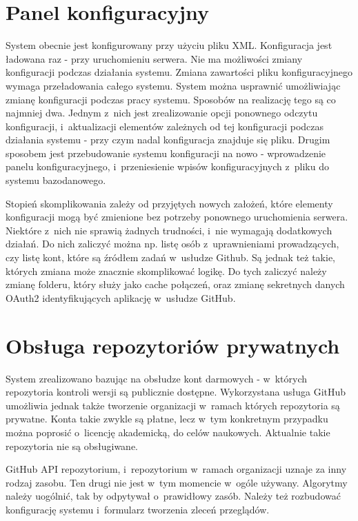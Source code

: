 \section{Panel konfiguracyjny}
System obecnie jest konfigurowany przy użyciu pliku XML. Konfiguracja jest ładowana raz - przy uruchomieniu serwera. Nie ma możliwości zmiany konfiguracji podczas działania systemu. Zmiana zawartości pliku konfiguracyjnego wymaga przeładowania całego systemu. System można usprawnić umożliwiając zmianę konfiguracji podczas pracy systemu. Sposobów na realizację tego są co najmniej dwa. Jednym z~nich jest zrealizowanie opcji ponownego odczytu konfiguracji, i~aktualizacji elementów zależnych od tej konfiguracji podczas działania systemu - przy czym nadal konfiguracja znajduje się pliku. Drugim sposobem jest przebudowanie systemu konfiguracji na nowo - wprowadzenie panelu konfiguracyjnego, i~przeniesienie wpisów konfiguracyjnych z~pliku do systemu bazodanowego.

\medskip
Stopień skomplikowania zależy od przyjętych nowych założeń, które elementy konfiguracji mogą być zmienione bez potrzeby ponownego uruchomienia serwera. Niektóre z~nich nie sprawią żadnych trudności, i~nie wymagają dodatkowych działań. Do nich zaliczyć można np. listę osób z~uprawnieniami prowadzących, czy listę kont, które są źródłem zadań w~usłudze Github. Są jednak też takie, których zmiana może znacznie skomplikować logikę. Do tych zaliczyć należy zmianę folderu, który służy jako cache połączeń, oraz zmianę sekretnych danych OAuth2 identyfikujących aplikację w~usłudze GitHub. 

\section{Obsługa repozytoriów prywatnych}
System zrealizowano bazując na obsłudze kont darmowych - w~których repozytoria kontroli wersji są publicznie dostępne. Wykorzystana usługa GitHub umożliwia jednak także tworzenie organizacji w~ramach których repozytoria są prywatne. Konta takie zwykle są płatne, lecz w~tym konkretnym przypadku można poprosić o~licencję akademicką, do celów naukowych. Aktualnie takie repozytoria nie są obsługiwane.

\medskip
GitHub API repozytorium, i~repozytorium w~ramach organizacji uznaje za inny rodzaj zasobu. Ten drugi nie jest w~tym momencie w~ogóle używany. Algorytmy należy uogólnić, tak by odpytywał o~prawidłowy zasób. Należy też rozbudować konfigurację systemu i~formularz tworzenia zleceń przeglądów.

